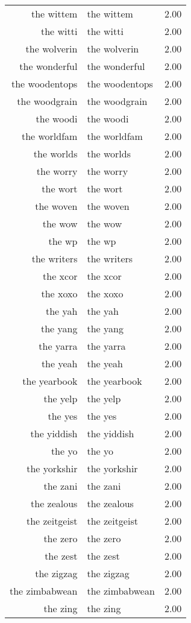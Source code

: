 \begin{table}[ht]
\begin{tabular}{rlr}
  the wittem & the wittem & 2.00 \\ 
  the witti & the witti & 2.00 \\ 
  the wolverin & the wolverin & 2.00 \\ 
  the wonderful & the wonderful & 2.00 \\ 
  the woodentops & the woodentops & 2.00 \\ 
  the woodgrain & the woodgrain & 2.00 \\ 
  the woodi & the woodi & 2.00 \\ 
  the worldfam & the worldfam & 2.00 \\ 
  the worlds & the worlds & 2.00 \\ 
  the worry & the worry & 2.00 \\ 
  the wort & the wort & 2.00 \\ 
  the woven & the woven & 2.00 \\ 
  the wow & the wow & 2.00 \\ 
  the wp & the wp & 2.00 \\ 
  the writers & the writers & 2.00 \\ 
  the xcor & the xcor & 2.00 \\ 
  the xoxo & the xoxo & 2.00 \\ 
  the yah & the yah & 2.00 \\ 
  the yang & the yang & 2.00 \\ 
  the yarra & the yarra & 2.00 \\ 
  the yeah & the yeah & 2.00 \\ 
  the yearbook & the yearbook & 2.00 \\ 
  the yelp & the yelp & 2.00 \\ 
  the yes & the yes & 2.00 \\ 
  the yiddish & the yiddish & 2.00 \\ 
  the yo & the yo & 2.00 \\ 
  the yorkshir & the yorkshir & 2.00 \\ 
  the zani & the zani & 2.00 \\ 
  the zealous & the zealous & 2.00 \\ 
  the zeitgeist & the zeitgeist & 2.00 \\ 
  the zero & the zero & 2.00 \\ 
  the zest & the zest & 2.00 \\ 
  the zigzag & the zigzag & 2.00 \\ 
  the zimbabwean & the zimbabwean & 2.00 \\ 
  the zing & the zing & 2.00 \\ 

\end{tabular}
\end{table}
